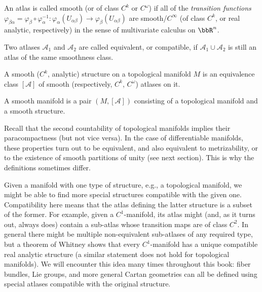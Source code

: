 \begin{defn}
    An atlas is called smooth (or of class $C^k$ or $C^\omega$) if all of the \emph{transition functions} $\varphi_{\beta\alpha}=\varphi_\beta\circ\varphi_\alpha^{-1}:\varphi_\alpha(U_{\alpha\beta})\to\varphi_\beta(U_{\alpha\beta})$ are smooth/$C^\infty$ (of class $C^k$, or real analytic, respectively) in the sense of multivariate calculus on $\bbR^n$.
\end{defn}
\begin{defn}
    Two atlases $\mathcal{A}_1$ and $\mathcal{A}_2$ are called equivalent, or compatible, if $\mathcal{A}_1\cup\mathcal{A}_2$ is still an atlas of the same smoothness class.
\end{defn}
\begin{defn}
    A smooth ($C^k$, analytic) structure on a topological manifold $M$ is an equivalence class $[\mathcal{A}]$ of smooth (respectively, $C^k$, $C^\omega$) atlases on it. 
\end{defn}
\begin{defn}
    A smooth manifold is a pair $(M,[\mathcal{A}])$ consisting of a topological manifold and a smooth structure.
\end{defn}

\begin{rem}
    Recall that the second countability of topological manifolds implies their paracompactness (but not vice versa). In the case of differentiable manifolds, these properties turn out to be equivalent, and also equivalent to metrizability, or to the existence of smooth partitions of unity (see next section). This is why the definitions sometimes differ.
\end{rem}

\begin{rem}
    Given a manifold with one type of structure, e.g., a topological manifold, we might be able to find more special structures compatible with the given one. Compatibility here means that the atlas defining the latter structure is a subset of the former. For example, given a $C^1$-manifold, its atlas might (and, as it turns out, always does) contain a sub-atlas whose transition maps are of class $C^2$. In general there might be multiple non-equivalent sub-atlases of any required type, but a theorem of Whitney shows that every $C^1$-manifold has a unique compatible real analytic structure (a similar statement does not hold for topological manifolds). We will encounter this idea many times throughout this book: fiber bundles, Lie groups, and more general Cartan geometries can all be defined using special atlases compatible with the original structure.
\end{rem}

